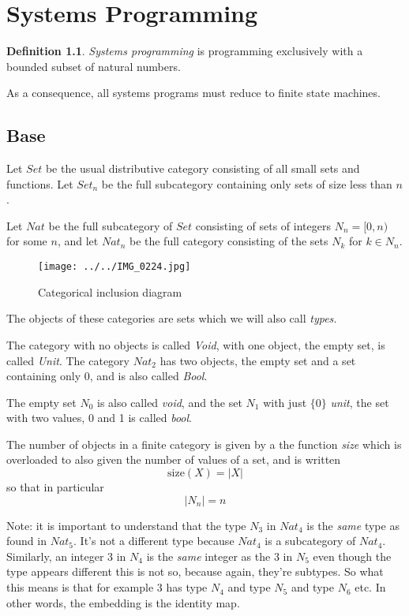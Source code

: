 \documentclass[oneside]{book}
\theoremstyle{plain}
\theoremstyle{definition}
\newtheorem{definition}{Definition}
\theoremstyle{plain}
\def\Set{\mathit{Set}}
\def\Nat{\mathit{Nat}}
\begin{document}
\chapter{Systems Programming}
\begin{definition}
{\em Systems programming} is programming exclusively with a bounded subset of natural numbers.
\end{definition}

As a consequence, all systems programs must reduce to finite state machines.

\section{Base}
Let $\Set$ be the usual distributive category consisting of all small sets and functions.
Let $\Set_n$ be the full subcategory containing only sets of size less than $n$.

Let $\Nat$ be the full subcategory of $\Set$ consisting
of sets of integers $\mathit{N}_n=[0,n)$ for some $n$, and let
$\Nat_n$ be the full category consisting of the 
sets $N_k$ for $k\in \mathit{N}_n$.

\begin{figure}[h]
\texttt{[image: ../../IMG\_0224.jpg]}
\caption{Categorical inclusion diagram}
\label{fig:categorical inclusion}
\end{figure}

The objects of these categories are sets which we will also call {\em types.}

The category with no objects is called {\em Void}, with one object, the empty set,
is called {\em Unit}. The category $\mathit{Nat_2}$ has two objects, the empty set
and a set containing only 0, and is also called {\em Bool}.

The empty set $\mathit{N_0}$ is also called {\em void}, and the set $\mathit{N_1}$
with just $\{0\}$ {\em unit}, the set with two values, 0 and 1 is called {\em bool}.

The number of objects in a finite category is given by a the function {\em size}
which is overloaded to also given the number of values of a set, and is written
\begin{equation}
\mathrm{size}(X) = |X|
\end{equation}
so that in particular
\begin{equation}
|N_n|=n
\end{equation}

Note: it is important to understand that the type $N_3$ in $\Nat_4$ is the {\em same}
type as found in $\Nat_5$. It's not a different type because $\Nat_4$ is a subcategory
of $\Nat_4$. Similarly, an integer $3$ in $N_4$ is the {\em same} integer as the $3$
in $N_5$ even though the type appears different this is not so, because again, they're
subtypes. So what this means is that for example $3$ has type $N_4$ and type $N_5$ and
type $N_6$ etc. In other words, the embedding is the identity map.
\end{document}
